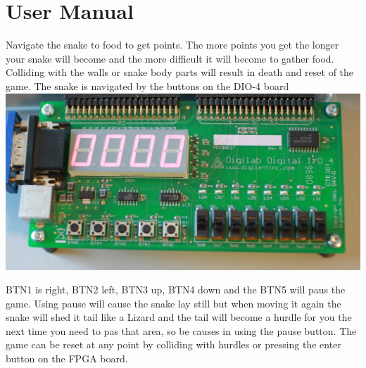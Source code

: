 \documentclass{acm_proc_article-sp}
\begin{document}


\appendix


%
%

\section{User Manual}
Navigate the snake to food to get points. The more points you get the longer your snake will become and the more difficult it will become to gather food.
Colliding with the walls or snake body parts will result in death and reset of the game. The snake is navigated by the buttons on the DIO-4 board 
\includegraphics[scale=0.064]{img/DIO4Buttons.jpg} 

BTN1 is right, BTN2 left, BTN3 up, BTN4 down and the BTN5 will paus the game. Using pause will cause the snake lay still but when moving it again the snake will shed it tail like a Lizard and the tail will become a hurdle for you the next time you need to pas that area, so be causes in using the pause button.
The game can be reset at any point by colliding with hurdles or pressing the enter button on the FPGA board.
\end{document}
